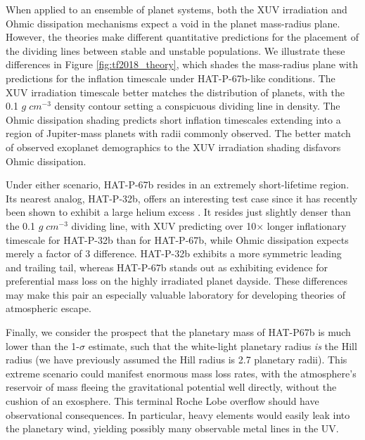 \documentclass[twocolumn]{aastex631}
\begin{document}
When applied to an ensemble of planet systems, both the XUV irradiation and Ohmic dissipation mechanisms expect a void in the planet mass-radius plane. However, the theories make different quantitative predictions for the placement of the dividing lines between stable and unstable populations.  We illustrate these differences in Figure \ref{fig:tf2018_theory}, which shades the mass-radius plane with predictions for the inflation timescale under HAT-P-67b-like conditions.  The XUV irradiation timescale better matches the distribution of planets, with the 0.1 $g\;cm^{-3}$ density contour setting a conspicuous dividing line in density.  The Ohmic dissipation shading predicts short inflation timescales extending into a region of Jupiter-mass planets with radii commonly observed.  The better match of observed exoplanet demographics to the XUV irradiation shading disfavors Ohmic dissipation.  

Under either scenario, HAT-P-67b resides in an extremely short-lifetime region.  Its nearest analog, HAT-P-32b, offers an interesting test case since it has recently been shown to exhibit a large helium excess \citep{doi:10.1126/sciadv.adf8736}.  It resides just slightly denser than the 0.1 $g\;cm^{-3}$ dividing line, with XUV predicting over 10$\times$ longer inflationary timescale for HAT-P-32b than for HAT-P-67b, while Ohmic dissipation expects merely a factor of 3 difference.  HAT-P-32b exhibits a more symmetric leading and trailing tail, whereas HAT-P-67b stands out as exhibiting evidence for preferential mass loss on the highly irradiated planet dayside.  These differences may make this pair an especially valuable laboratory for developing theories of atmospheric escape.

Finally, we consider the prospect that the planetary mass of HAT-P67b is much lower than the 1-$\sigma$ estimate, such that the white-light planetary radius \emph{is} the Hill radius (we have previously assumed the Hill radius is 2.7 planetary radii).  This extreme scenario could manifest enormous mass loss rates, with the atmosphere's reservoir of mass fleeing the gravitational potential well directly, without the cushion of an exosphere.  This terminal Roche Lobe overflow should have observational consequences.  In particular, heavy elements would easily leak into the planetary wind, yielding possibly many observable metal lines in the UV.
\end{document}
